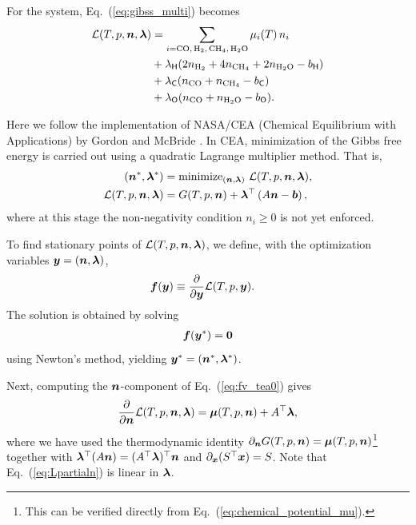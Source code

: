 For the  system, Eq.~(\ref{eq:gibss_multi}) becomes
\begin{align}
    \mathcal{L}(T, p, \nv,\lambdav) &= \sum_{i = \ce{CO, H2, CH4, H2O}} \mu_i (T) \, n_i \nonumber \\ 
    &+ \lambda_{\Hel} (2 n_{\ce{H2}} + 4 n_{\ce{CH4}} + 2 n_{\ce{H2O}} - b_\Hel) \nonumber \\
    &+ \lambda_{\Cel} (n_{\ce{CO}} + n_{\ce{CH4}} - b_\Cel) \nonumber \\ 
    &+ \lambda_{\Oel} (n_{\ce{CO}} + n_{\ce{H2O}} - b_\Oel).
\end{align}

Here we follow the implementation of NASA/CEA (Chemical Equilibrium with Applications) by Gordon and McBride \cite{gordon1994computer,2024arXiv241207166G}. In CEA, minimization of the Gibbs free energy is carried out using a quadratic Lagrange multiplier method. That is,
\begin{align}
    (\boldsymbol{n}^\ast, \boldsymbol{\lambda}^\ast)  &= \mathrm{minimize}_{(\boldsymbol{n},\boldsymbol{\lambda})} \,\, \mathcal{L}(T, p, \boldsymbol{n}, \boldsymbol{\lambda}), \\
    \mathcal{L}(T, p, \boldsymbol{n},\boldsymbol{\lambda}) &= G(T, p, \boldsymbol{n}) + \boldsymbol{\lambda}^\top \left(A \boldsymbol{n} - \boldsymbol{b}\right),
\end{align}
where at this stage the non-negativity condition $n_i \ge 0$ is not yet enforced.

To find stationary points of $\mathcal{L}(T, p, \boldsymbol{n}, \boldsymbol{\lambda})$, we define, with the optimization variables $\boldsymbol{y} = (\boldsymbol{n}, \boldsymbol{\lambda})$,
\begin{align}
\label{eq:fv_tea0}
    \boldsymbol{f}(\boldsymbol{y}) &\equiv \frac{\partial}{\partial \boldsymbol{y}} \mathcal{L}(T, p, \boldsymbol{y}).
\end{align}
The solution is obtained by solving
\begin{align}
    \label{eq:fv_tea}
    \boldsymbol{f}(\boldsymbol{y}^\ast) = \boldsymbol{0}
\end{align}
using Newton’s method, yielding $\boldsymbol{y}^\ast = (\boldsymbol{n}^\ast, \boldsymbol{\lambda}^\ast)$.  

Next, computing the $\boldsymbol{n}$-component of Eq.~(\ref{eq:fv_tea0}) gives
\begin{align}
\label{eq:Lpartialn}
    \frac{\partial}{\partial \boldsymbol{n}}   \mathcal{L}(T, p, \boldsymbol{n}, \boldsymbol{\lambda}) =  \boldsymbol{\mu} (T, p, \boldsymbol{n}) + A^\top \boldsymbol{\lambda},
\end{align}
where we have used the thermodynamic identity $\partial_{\boldsymbol{n}} G(T, p, \boldsymbol{n}) =  \boldsymbol{\mu} (T, p, \boldsymbol{n})$\footnote{This can be verified directly from Eq.~(\ref{eq:chemical_potential_mu}).} together with $\boldsymbol{\lambda}^\top (A \boldsymbol{n}) = (A^\top \boldsymbol{\lambda})^\top \boldsymbol{n}$ and $\partial_{\boldsymbol{x}} (S^\top \boldsymbol{x}) = S$.  
Note that Eq.~(\ref{eq:Lpartialn}) is linear in $\boldsymbol{\lambda}$.  

